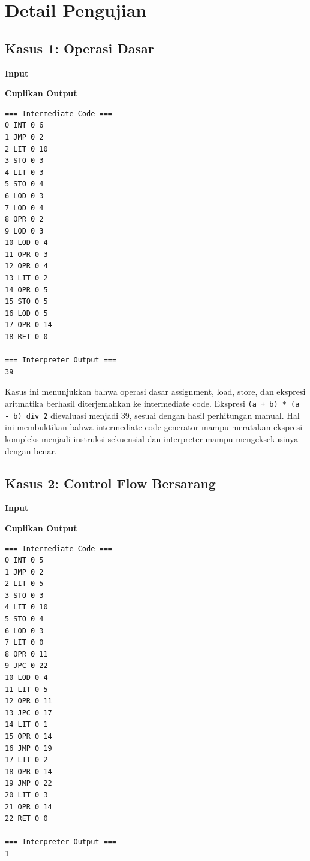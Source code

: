 \section{Detail Pengujian}

\subsection{Kasus 1: Operasi Dasar}
\textbf{Input}\par


\textbf{Cuplikan Output}\par
\begin{lstlisting}[basicstyle=\ttfamily\scriptsize,breaklines=true,frame=single,numbers=none]
=== Intermediate Code ===
0 INT 0 6
1 JMP 0 2
2 LIT 0 10
3 STO 0 3
4 LIT 0 3
5 STO 0 4
6 LOD 0 3
7 LOD 0 4
8 OPR 0 2
9 LOD 0 3
10 LOD 0 4
11 OPR 0 3
12 OPR 0 4
13 LIT 0 2
14 OPR 0 5
15 STO 0 5
16 LOD 0 5
17 OPR 0 14
18 RET 0 0

=== Interpreter Output ===
39
\end{lstlisting}

Kasus ini menunjukkan bahwa operasi dasar assignment, load, store, dan ekspresi aritmatika berhasil diterjemahkan ke intermediate code. Ekspresi \texttt{(a + b) * (a - b) div 2} dievaluasi menjadi 39, sesuai dengan hasil perhitungan manual. Hal ini membuktikan bahwa intermediate code generator mampu meratakan ekspresi kompleks menjadi instruksi sekuensial dan interpreter mampu mengeksekusinya dengan benar.

\subsection{Kasus 2: Control Flow Bersarang}
\textbf{Input}\par


\textbf{Cuplikan Output}\par
\begin{lstlisting}[basicstyle=\ttfamily\scriptsize,breaklines=true,frame=single,numbers=none]
=== Intermediate Code ===
0 INT 0 5
1 JMP 0 2
2 LIT 0 5
3 STO 0 3
4 LIT 0 10
5 STO 0 4
6 LOD 0 3
7 LIT 0 0
8 OPR 0 11
9 JPC 0 22
10 LOD 0 4
11 LIT 0 5
12 OPR 0 11
13 JPC 0 17
14 LIT 0 1
15 OPR 0 14
16 JMP 0 19
17 LIT 0 2
18 OPR 0 14
19 JMP 0 22
20 LIT 0 3
21 OPR 0 14
22 RET 0 0

=== Interpreter Output ===
1
\end{lstlisting}

